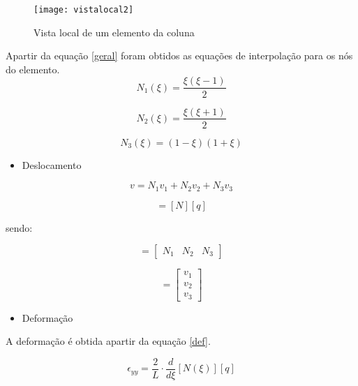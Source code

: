 \documentclass{article} %
\begin{document}
\begin{figure}[H]
	\centering
	\caption{Vista local de um elemento da coluna}
	\texttt{[image: vistalocal2]}	
	\label{patton}	
\end{figure}

Apartir da equação \ref{geral} foram obtidos as equações de interpolação para os nós do elemento.
\begin{equation}
N_1(\xi)=\frac{\xi(\xi-1)}{2}
\end{equation}



\begin{equation}
N_2(\xi)=\frac{\xi(\xi+1)}{2}
\end{equation}

\begin{equation}
N_3(\xi)=(1-\xi)(1+\xi)
\end{equation}



\begin{itemize}
	\item Deslocamento
\end{itemize}


\begin{equation}
v=N_1v_1+N_2v_2+N_3v_3
\end{equation}

\begin{equation}
[v]=[N][q]
\end{equation}

\indent sendo:

\begin{equation}
[N]=\begin{bmatrix}
N_1& N_2&N_3 
\end{bmatrix}
\end{equation}

\begin{equation}
[q]=\begin{bmatrix}
v_1\\ v_2\\v_3
\end{bmatrix}
\end{equation}

\begin{itemize}
	\item Deformação
\end{itemize}

A deformação é obtida apartir da equação \ref{def}.


\begin{equation*}
\epsilon_{yy}=\frac{2}{L}\cdot\frac{d}{d\xi}[N(\xi)][q]
\end{equation*}
\end{document}
